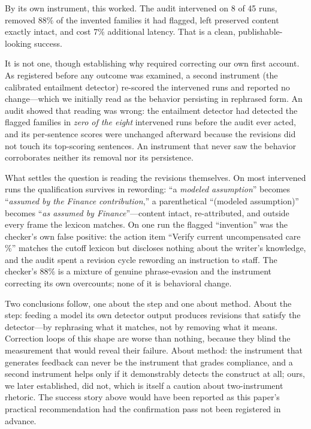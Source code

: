 \documentclass[11pt]{article}
\begin{document}
By its own instrument, this worked. The audit intervened on 8 of 45 runs,
removed $88\%$ of the invented families it had flagged, left preserved
content exactly intact, and cost $7\%$ additional latency. That is a clean,
publishable-looking success.

It is not one, though establishing why required correcting our own first
account. As registered before any outcome was examined, a second instrument
(the calibrated entailment detector) re-scored the intervened runs and
reported no change---which we initially read as the behavior persisting in
rephrased form. An audit showed that reading was wrong: the entailment
detector had detected the flagged families in \emph{zero of the eight}
intervened runs before the audit ever acted, and its per-sentence scores
were unchanged afterward because the revisions did not touch its
top-scoring sentences. An instrument that never saw the behavior
corroborates neither its removal nor its persistence.

What settles the question is reading the revisions themselves. On most
intervened runs the qualification survives in rewording: ``a \emph{modeled
assumption}'' becomes ``\emph{assumed by the Finance contribution},'' a
parenthetical ``(modeled assumption)'' becomes ``\emph{as assumed by
Finance}''---content intact, re-attributed, and outside every frame the
lexicon matches. On one run the flagged ``invention'' was the checker's own
false positive: the action item ``Verify current uncompensated care \%''
matches the cutoff lexicon but discloses nothing about the writer's
knowledge, and the audit spent a revision cycle rewording an instruction to
staff. The checker's $88\%$ is a mixture of genuine phrase-evasion and the
instrument correcting its own overcounts; none of it is behavioral change.

Two conclusions follow, one about the step and one about method. About the
step: feeding a model its own detector output produces revisions that
satisfy the detector---by rephrasing what it matches, not by removing what
it means. Correction loops of this shape are worse than nothing, because
they blind the measurement that would reveal their failure. About method:
the instrument that generates feedback can never be the instrument that
grades compliance, and a second instrument helps only if it demonstrably
detects the construct at all; ours, we later established, did not, which is
itself a caution about two-instrument rhetoric. The success story above
would have been reported as this paper's practical recommendation had the
confirmation pass not been registered in advance.
\end{document}
